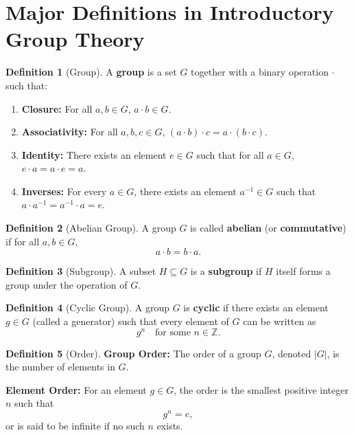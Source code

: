 \documentclass[12pt]{article}
\theoremstyle{definition} %
\newtheorem{definition}{Definition}
\theoremstyle{plain} %
\begin{document}
      \section*{Major Definitions in Introductory Group Theory}

\begin{definition}[Group]
A \textbf{group} is a set \(G\) together with a binary operation \(\cdot\) such that:
\begin{enumerate}[label=(\roman*)]
    \item \textbf{Closure:} For all \(a,b\in G\), \(a\cdot b\in G\).
    \item \textbf{Associativity:} For all \(a,b,c\in G\), \((a\cdot b)\cdot c = a\cdot (b\cdot c)\).
    \item \textbf{Identity:} There exists an element \(e\in G\) such that for all \(a\in G\), \(e\cdot a = a\cdot e = a\).
    \item \textbf{Inverses:} For every \(a\in G\), there exists an element \(a^{-1}\in G\) such that \(a\cdot a^{-1} = a^{-1}\cdot a = e\).
\end{enumerate}
\end{definition}

\begin{definition}[Abelian Group]
A group \(G\) is called \textbf{abelian} (or \textbf{commutative}) if for all \(a,b\in G\), 
\[
a\cdot b = b\cdot a.
\]
\end{definition}

\begin{definition}[Subgroup]
A subset \(H\subseteq G\) is a \textbf{subgroup} if \(H\) itself forms a group under the operation of \(G\).
\end{definition}

\begin{definition}[Cyclic Group]
A group \(G\) is \textbf{cyclic} if there exists an element \(g\in G\) (called a generator) such that every element of \(G\) can be written as 
\[
g^n \quad \text{for some } n\in \mathbb{Z}.
\]
\end{definition}

\begin{definition}[Order]
\textbf{Group Order:} The order of a group \(G\), denoted \(|G|\), is the number of elements in \(G\).

\medskip

\textbf{Element Order:} For an element \(g\in G\), the order is the smallest positive integer \(n\) such that
\[
g^n = e,
\]
or is said to be infinite if no such \(n\) exists.
\end{definition}
\end{document}
